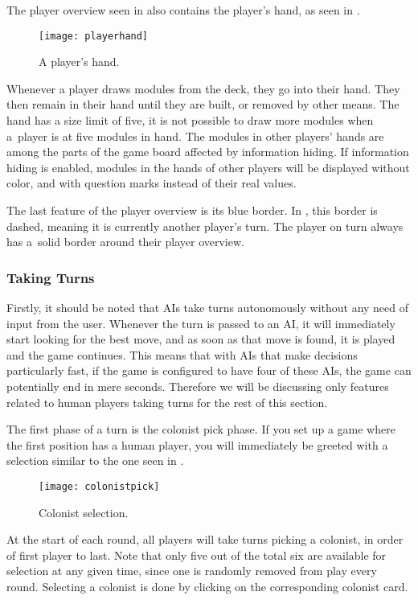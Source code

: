 The player overview seen in  also contains the player's hand, as seen
in .

\begin{figure}[ht]
\centerline{\mbox{\texttt{[image: playerhand]}}}
\caption{A player's hand.}\label{ud:hand}
\end{figure}

Whenever a player draws modules from the deck, they go into their hand. They then remain in
their hand until they are built, or removed by other means. The hand has a size limit of
five, it is not possible to draw more modules when a~player is at five modules in hand.
The modules in other players' hands are among the parts of the game board affected
by information hiding. If information hiding is enabled, modules in the hands of other
players will be displayed without color, and with question marks instead of
their real values.

The last feature of the player overview is its blue border. In ,
this border is dashed, meaning it is currently another player's turn. The player on
turn always has a~solid border around their player overview.

\subsubsection{Taking Turns}

Firstly, it should be noted that AIs take turns autonomously without any need of input
from the user. Whenever the turn is passed to an AI, it will immediately start
looking for the best move, and as soon as that move is found, it is played and the game
continues. This means that with AIs that make decisions particularly fast, if the game
is configured to have four of these AIs, the game can potentially end in mere seconds.
Therefore we will be discussing only features related to human players taking turns
for the rest of this section.

The first phase of a turn is the colonist pick phase. If you set up a game where
the first position has a human player, you will immediately be greeted with a selection
similar to the one seen in .

\begin{figure}[ht]
\centerline{\mbox{\texttt{[image: colonistpick]}}}
\caption{Colonist selection.}\label{ud:colonistpick}
\end{figure}

At the start of each round, all players will take turns picking a colonist,
in order of first player to last. Note that only five out of the total
six are available for selection at any given time, since one is randomly removed
from play every round. Selecting a colonist is done by clicking on the corresponding
colonist card.

